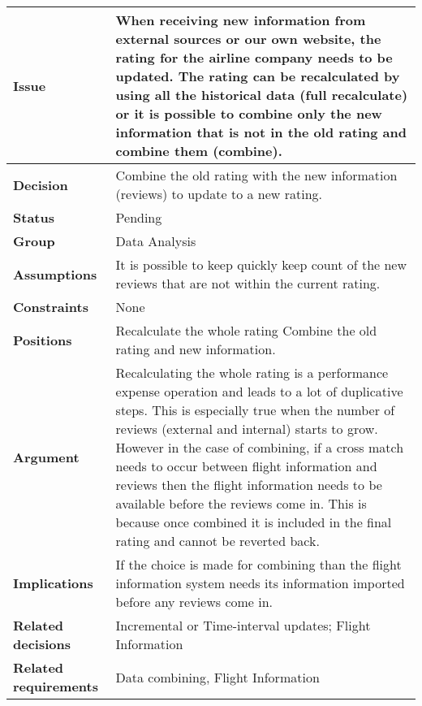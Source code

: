 
\label{dd:recalc-comb}
\begin{tabular}{ l  p{10cm}}
\hline
\bf Issue & When receiving new information from external sources or our own website, the rating for the airline company needs to be updated. The rating can be recalculated by using all the historical data (full recalculate) or it is possible to combine only the new information that is not in the old rating and combine them (combine). \\
\hline
\bf Decision & Combine the old rating with the new information (reviews) to update to a new rating. \\
\hline
\bf Status & Pending \\
\hline
\bf Group & Data Analysis \\
\hline
\bf Assumptions & It is possible to keep quickly keep count of the new reviews that are not within the current rating. \\
\hline
\bf Constraints & None \\
\hline
\bf Positions & Recalculate the whole rating \newline\newline
Combine the old rating and new information. \\
\hline
\bf Argument & Recalculating the whole rating is a performance expense operation and leads to a lot of duplicative steps. This is especially true when the number of reviews (external and internal) starts to grow. However in the case of combining, if a cross match needs to occur between flight information and reviews then the flight information needs to be available before the reviews come in. This is because once combined it is included in the final rating and cannot be reverted back. \\
\hline
\bf Implications & If the choice is made for combining than the flight information system needs its information imported before any reviews come in. \\
\hline
\bf Related decisions & Incremental or Time-interval updates; Flight Information \\
\hline
\bf Related requirements  & Data combining, Flight Information \\
\hline
\end{tabular}
